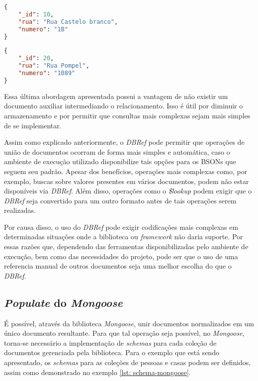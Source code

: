 \begin{lstlisting}[language=json, caption={Documento da Casa de Número 1B\label{lst: doc-dbref-casa-1b-sem-documento-auxiliar}}]
{
    "_id": 10,
    "rua": "Rua Castelo branco",
    "numero": "1B"
}
\end{lstlisting}


\begin{lstlisting}[language=json, caption={Documento da Casa de Número 1089\label{lst: doc-dbref-casa-1089-sem-documento-auxiliar}}]
{
    "_id": 20,
    "rua": "Rua Pompel",
    "numero": "1089"
}
\end{lstlisting}

Essa última abordagem apresentada possui a vantagem de não existir um documento auxiliar intermediando o relacionamento. Isso é útil por diminuir o armazenamento e por permitir que consultas mais complexas sejam mais simples de se implementar.

Assim como explicado anteriormente, o \textit{DBRef} pode permitir que operações de união de documentos ocorram de forma mais simples e automática, caso o ambiente de execução utilizado disponibilize tais opções para os BSONs que seguem seu padrão. Apesar dos benefícios, operações mais complexas como, por exemplo, buscas sobre valores presentes em vários documentos, podem não estar disponíveis via \textit{DBRef}. Além disso, operações como o \textit{\$lookup} podem exigir que o \textit{DBRef} seja convertido para um outro formato antes de tais operações serem realizadas. 

Por causa disso, o uso do \textit{DBRef} pode exigir codificações mais complexas em determinadas situações onde a biblioteca ou \textit{framework} não daria suporte. Por essas razões que, dependendo das ferramentas disponibilizadas pelo ambiente de execução, bem como das necessidades do projeto, pode ser que o uso de uma referencia manual de outros documentos seja uma melhor escolha do que o \textit{DBRef}.

\subsection{\textit{Populate} do \textit{Mongoose}}

É possível, através da biblioteca \textit{Mongoose}, unir documentos normalizados em um único documento resultante. Para que tal operação seja possível, no \textit{Mongoose}, torna-se necessário a implementação de \textit{schemas} para cada coleção de documentos gerenciada pela biblioteca. Para o exemplo que está sendo apresentado, os \textit{schemas} para as coleções de pessoas e casas podem ser definidos, assim como demonstrado no exemplo \ref{lst: schema-mongoose}.

